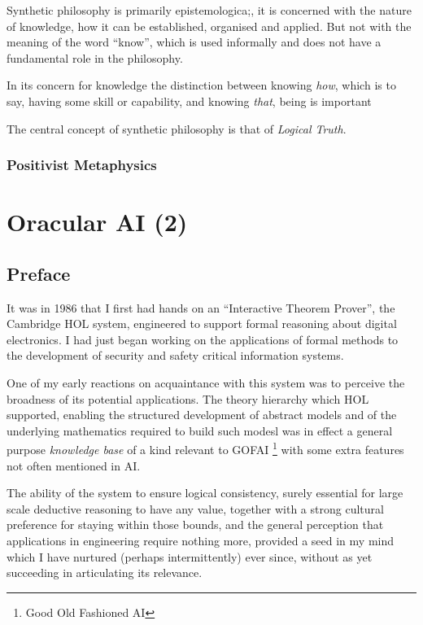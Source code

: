 \documentclass[10pt,titlepage]{book}
\begin{document}
Synthetic philosophy is primarily epistemologica;, it is concerned with the nature of knowledge, how it can be established, organised and applied.
But not with the meaning of the word ``know'', which is used informally and does not have a fundamental role in the philosophy.

In its concern for knowledge the distinction between knowing \emph{how}, which is to say, having some skill or capability, and knowing \emph{that}, being  is important

The central concept of synthetic philosophy is that of \emph{Logical Truth}.

\subsection{Positivist Metaphysics}




\chapter{Oracular AI (2)}

\section*{Preface}

It was in 1986 that I first had hands on an ``Interactive Theorem Prover'', the Cambridge HOL system,
engineered to support formal reasoning about digital electronics.
I had just began working on the applications of formal methods to the development of security and safety critical information systems.

One of my early reactions on acquaintance with this system was to perceive the broadness of its potential applications.
The theory hierarchy which HOL supported, enabling the structured development of abstract models and of  the underlying mathematics required to build such modesl was in effect a general purpose \emph{knowledge base} of a kind relevant to GOFAI \footnote{Good Old Fashioned AI} with some extra features not often mentioned in AI.

The ability of the system to ensure logical consistency, surely essential for large scale deductive reasoning to have any value, together with a strong cultural preference for staying within those bounds, and the general perception that applications in engineering require nothing more, provided a seed in my mind which I have nurtured (perhaps intermittently) ever since, without as yet succeeding in articulating its relevance.
\end{document}
